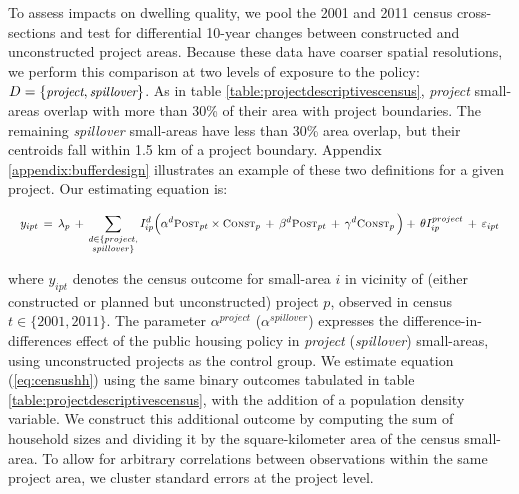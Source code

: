 \documentclass[12pt]{article}
\begin{document}
To assess impacts on dwelling quality, we pool the 2001 and 2011 census cross-sections and test for differential 10-year changes between constructed and unconstructed project areas. Because these data have coarser spatial resolutions, we perform this comparison at two levels of exposure to the policy: $D=\{\text{\small\it project},\text{\small\it spillover}\}$. As in table \ref{table:projectdescriptivescensus}, {\it project} small-areas overlap with more than 30\% of their area with project boundaries. The remaining {\it spillover} small-areas have less than 30\% area overlap, but their centroids fall within 1.5 km of a project boundary. Appendix \ref{appendix:bufferdesign} illustrates an example of these two definitions for a given project. Our estimating equation is:

\vspace{-4mm}

\begin{equation}\label{eq:censushh}
\quad y_{ipt} \, = \, \lambda_{p} \,+\, \sum\limits_{\substack{d\in \{project,\\ spillover\}}} I^d_{ip}\Big( \alpha^d \textsc{\small Post}_{pt}\times\textsc{\small Const}_{p} \, + \, \beta^d\textsc{\small Post}_{pt} \, + \, \gamma^d\textsc{\small Const}_{p} \,\Big) + \, \theta I^{project}_{ip} \, +  \, \varepsilon_{ipt} \quad 
\end{equation}

\noindent where $y_{ipt}$ denotes the census outcome for small-area $i$ in vicinity of (either constructed or planned but unconstructed) project $p$, observed in census $t\in\{2001,2011\}$. The parameter $\alpha^{project}$ ($\alpha^{spillover}$) expresses the difference-in-differences effect of the public housing policy in {\it project} ({\it spillover}) small-areas, using unconstructed projects as the control group. We estimate equation (\ref{eq:censushh}) using the same binary outcomes tabulated in table \ref{table:projectdescriptivescensus}, with the addition of a population density variable. We construct this additional outcome by computing the sum of household sizes  and dividing it by the square-kilometer area of the census small-area. To allow for arbitrary correlations between observations within the same project area, we cluster standard errors at the project level. 
\end{document}
